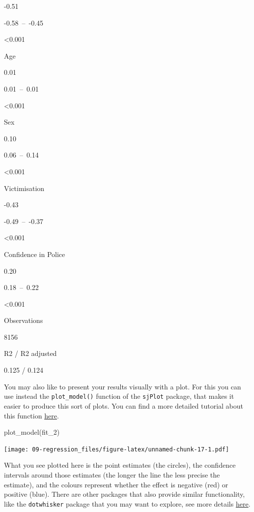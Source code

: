 \documentclass[
]{book}
\newenvironment{Shaded}{\begin{snugshade}}{\end{snugshade}}
\newcommand{\FunctionTok}[1]{\textcolor[rgb]{0.00,0.00,0.00}{#1}}
\newcommand{\NormalTok}[1]{#1}
\begin{document}
-0.51

-0.58~--~-0.45

\textless0.001

Age

0.01

0.01~--~0.01

\textless0.001

Sex

0.10

0.06~--~0.14

\textless0.001

Victimisation

-0.43

-0.49~--~-0.37

\textless0.001

Confidence in Police

0.20

0.18~--~0.22

\textless0.001

Observations

8156

R2 / R2 adjusted

0.125 / 0.124

You may also like to present your results visually with a plot. For this you can use instead the \texttt{plot\_model()} function of the \texttt{sjPlot} package, that makes it easier to produce this sort of plots. You can find a more detailed tutorial about this function \href{https://strengejacke.wordpress.com/2017/10/23/one-function-to-rule-them-all-visualization-of-regression-models-in-rstats-w-sjplot/}{here}.

\begin{Shaded}
\begin{Highlighting}[]
\FunctionTok{plot\_model}\NormalTok{(fit\_2)}
\end{Highlighting}
\end{Shaded}

\texttt{[image: 09-regression\_files/figure-latex/unnamed-chunk-17-1.pdf]}

What you see plotted here is the point estimates (the circles), the confidence intervals around those estimates (the longer the line the less precise the estimate), and the colours represent whether the effect is negative (red) or positive (blue). There are other packages that also provide similar functionality, like the \texttt{dotwhisker} package that you may want to explore, see more details \href{https://cran.r-project.org/web/packages/dotwhisker/vignettes/dotwhisker-vignette.html}{here}.
\end{document}
